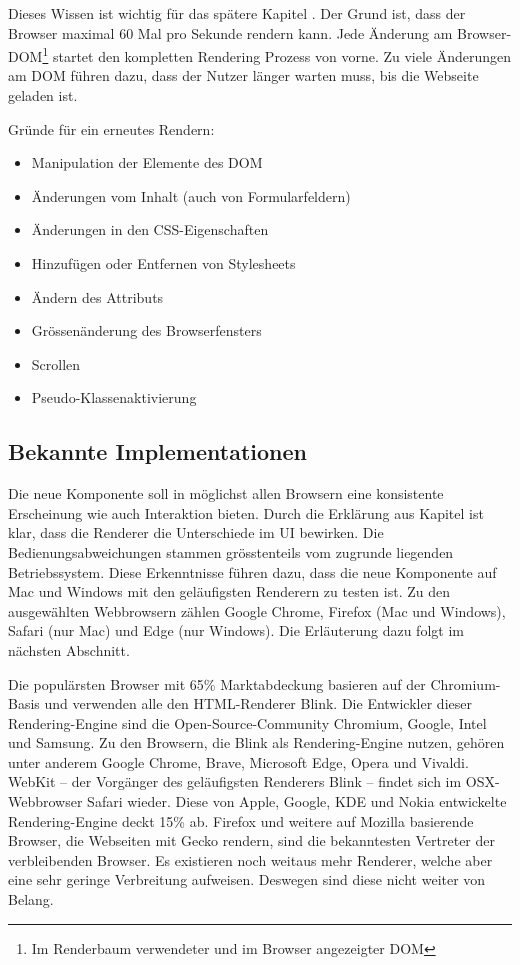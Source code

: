 Dieses Wissen ist wichtig für das spätere Kapitel \textbf{}. 
Der Grund ist, dass der Browser maximal 60 Mal pro Sekunde rendern kann. 
Jede Änderung am Browser-DOM\footnote{
    Im Renderbaum verwendeter und im Browser angezeigter DOM
} startet den kompletten Rendering Prozess von vorne. 
Zu viele Änderungen am DOM führen dazu, dass der Nutzer länger warten muss, bis die Webseite geladen ist. 

Gründe für ein erneutes Rendern: 

\begin{itemize}
    \item Manipulation der Elemente des DOM
    \item Änderungen vom Inhalt (auch von Formularfeldern)
    \item Änderungen in den CSS-Eigenschaften
    \item Hinzufügen oder Entfernen von Stylesheets
    \item Ändern des Attributs 
    \item Grössenänderung des Browserfensters
    \item Scrollen
    \item Pseudo-Klassenaktivierung
\end{itemize}


\subsection{Bekannte Implementationen}
\label{sec:implementationsRenderer}

Die neue Komponente soll in möglichst allen Browsern eine konsistente Erscheinung wie auch Interaktion bieten. 
Durch die Erklärung aus Kapitel \textbf{} ist klar, dass die Renderer die Unterschiede im UI bewirken. 
Die Bedienungsabweichungen stammen grösstenteils vom zugrunde liegenden Betriebssystem. 
Diese Erkenntnisse führen dazu, dass die neue Komponente auf Mac und Windows mit den geläufigsten Renderern zu testen ist. 
Zu den ausgewählten Webbrowsern zählen Google Chrome, Firefox (Mac und Windows), Safari (nur Mac) und Edge (nur Windows). 
Die Erläuterung dazu folgt im nächsten Abschnitt. 

Die populärsten Browser mit 65\% Marktabdeckung basieren auf der Chromium-Basis und verwenden alle den HTML-Renderer Blink. 
Die Entwickler dieser Rendering-Engine sind die Open-Source-Community Chromium, Google, Intel und Samsung.
Zu den Browsern, die Blink als Rendering-Engine nutzen, gehören unter anderem Google Chrome, Brave, Microsoft Edge, Opera und Vivaldi. 
WebKit – der Vorgänger des geläufigsten Renderers Blink – findet sich im OSX-Webbrowser Safari wieder. 
Diese von Apple, Google, KDE und Nokia entwickelte Rendering-Engine deckt 15\% ab. 
Firefox und weitere auf Mozilla basierende Browser, die Webseiten mit Gecko rendern, sind die bekanntesten Vertreter der verbleibenden Browser. 
Es existieren noch weitaus mehr Renderer, welche aber eine sehr geringe Verbreitung aufweisen. 
Deswegen sind diese nicht weiter von Belang.
